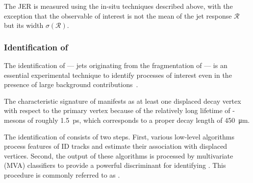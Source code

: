 The JER is measured using the in-situ techniques described above, with the exception that the observable of interest is not the mean of the jet response  \(\mathcal{R}\) but its width \(\sigma(\mathcal{R})\).


\subsubsection{Identification of \bjets}
\label{sec:methods:event-reconstruction:jets:btagging}
The identification of \bjets --- jets originating from the fragmentation of \bquarks --- is an essential experimental technique to identify processes of interest even in the presence of large background contributions~\cite{ATL-PHYS-PUB-2017-013,FTAG-2018-01}.

The characteristic signature of \bjets manifests as at least one displaced decay vertex with respect to the primary vertex because of the relatively long lifetime of \PB-mesons of roughly \SI{1.5}{\pico\second}, which corresponds to a proper decay length of \SI{450}{\micro\meter}.

The identification of \bjets consists of two steps. First, various low-level algorithms process features of ID tracks and estimate their association with displaced vertices. Second, the output of these algorithms is processed by multivariate (MVA) classifiers to provide a powerful discriminant for identifying \bjets. This procedure is commonly referred to as \btagging.

